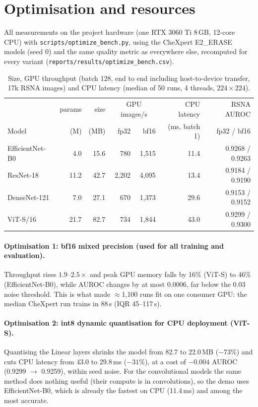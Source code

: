 \documentclass[11pt,a4paper]{article}
\newcommand{\code}[1]{\texttt{\small #1}}
\begin{document}
\section{Optimisation and resources}
\label{sec:opt}
All measurements on the project hardware (one RTX 3060 Ti 8\,GB, 12-core CPU) with \code{scripts/\allowbreak{}optimize\_\allowbreak{}bench.py}, using the CheXpert E2\_ERASE models (seed 0) and the same quality metric as everywhere else, recomputed for every variant (\code{reports/\allowbreak{}results/\allowbreak{}optimize\_\allowbreak{}bench.csv}).

\begin{table}[h]\centering\small
\begin{tabular}{lrrrrrr}\toprule
 & params & size & \multicolumn{2}{c}{GPU images/s} & CPU latency & RSNA AUROC\\
Model & (M) & (MB) & fp32 & bf16 & (ms, batch 1) & fp32 / bf16\\\midrule
EfficientNet-B0 & 4.0 & 15.6 & 780 & 1{,}515 & 11.4 & 0.9268 / 0.9263\\
ResNet-18 & 11.2 & 42.7 & 2{,}202 & 4{,}095 & 13.4 & 0.9184 / 0.9190\\
DenseNet-121 & 7.0 & 27.1 & 670 & 1{,}373 & 29.6 & 0.9153 / 0.9152\\
ViT-S/16 & 21.7 & 82.7 & 734 & 1{,}844 & 43.0 & 0.9299 / 0.9300\\\bottomrule
\end{tabular}
\caption{Size, GPU throughput (batch 128, end to end including host-to-device transfer, 17k RSNA images) and CPU latency (median of 50 runs, 4 threads, $224{\times}224$).}\label{tab:opt}
\end{table}

\paragraph{Optimisation 1: bf16 mixed precision (used for all training and evaluation).} Throughput rises $1.9$--$2.5\times$ and peak GPU memory falls by 16\% (ViT-S) to 46\% (EfficientNet-B0), while AUROC changes by at most $0.0006$, far below the $0.03$ noise threshold. This is what made $\approx$1{,}100 runs fit on one consumer GPU: the median CheXpert run trains in 88\,s (IQR 45--117\,s).

\paragraph{Optimisation 2: int8 dynamic quantisation for CPU deployment (ViT-S).} Quantising the Linear layers shrinks the model from 82.7 to 22.0\,MB ($-73\%$) and cuts CPU latency from 43.0 to 29.8\,ms ($-31\%$), at a cost of $-0.004$ AUROC (0.9299 $\rightarrow$ 0.9259), within seed noise. For the convolutional models the same method does nothing useful (their compute is in convolutions), so the demo uses EfficientNet-B0, which is already the fastest on CPU (11.4\,ms) and among the most accurate.
\end{document}
